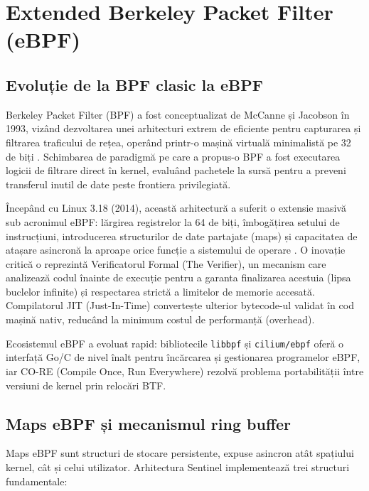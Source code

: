 \section{Extended Berkeley Packet Filter (eBPF)}
\label{sec:ebpf}

\subsection{Evoluție de la BPF clasic la eBPF}
\label{subsec:ebpf_history}

\par Berkeley Packet Filter (BPF) a fost conceptualizat de McCanne și Jacobson în 1993, vizând dezvoltarea unei arhitecturi extrem de eficiente pentru capturarea și filtrarea traficului de rețea, operând printr-o mașină virtuală minimalistă pe 32 de biți \cite{McCanne1993}. Schimbarea de paradigmă pe care a propus-o BPF a fost executarea logicii de filtrare direct în kernel, evaluând pachetele la sursă pentru a preveni transferul inutil de date peste frontiera privilegiată.

\par Începând cu Linux 3.18 (2014), această arhitectură a suferit o extensie masivă sub acronimul eBPF: lărgirea registrelor la 64 de biți, îmbogățirea setului de instrucțiuni, introducerea structurilor de date partajate (maps) și capacitatea de atașare asincronă la aproape orice funcție a sistemului de operare \cite{Rice2023}. O inovație critică o reprezintă Verificatorul Formal (The Verifier), un mecanism care analizează codul înainte de execuție pentru a garanta finalizarea acestuia (lipsa buclelor infinite) și respectarea strictă a limitelor de memorie accesată. Compilatorul JIT (Just-In-Time) convertește ulterior bytecode-ul validat în cod mașină nativ, reducând la minimum costul de performanță (overhead).

\par Ecosistemul eBPF a evoluat rapid: bibliotecile \texttt{libbpf} și \texttt{cilium/ebpf} \cite{CiliumEBPF} oferă o interfață Go/C de nivel înalt pentru încărcarea și gestionarea programelor eBPF, iar CO-RE (Compile Once, Run Everywhere) rezolvă problema portabilității între versiuni de kernel prin relocări BTF.


\subsection{Maps eBPF și mecanismul ring buffer}
\label{subsec:ebpf_maps}

\par Maps eBPF sunt structuri de stocare persistente, expuse asincron atât spațiului kernel, cât și celui utilizator. Arhitectura Sentinel implementează trei structuri fundamentale:

